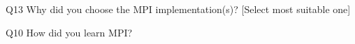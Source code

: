 \begin{description}%
\item{Q13} Why did you choose the MPI implementation(s)? [Select most suitable one]%
\item{Q10} How did you learn MPI?%
\end{description}%
